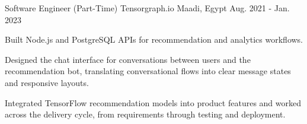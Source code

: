 \begin{cventries}
\vspace{1.5mm}

  \cventry
    {Software Engineer (Part-Time)} %
    {Tensorgraph.io} %
    {Maadi, Egypt} %
    {Aug. 2021 - Jan. 2023} %
    {
      \begin{cvitems} %
        \item {Built Node.js and PostgreSQL APIs for recommendation and analytics workflows.}        \item {Designed the chat interface for conversations between users and the recommendation bot, translating conversational flows into clear message states and responsive layouts.}
        \item {Integrated TensorFlow recommendation models into product features and worked across the delivery cycle, from requirements through testing and deployment.}
      \end{cvitems}
    }
\end{cventries}
